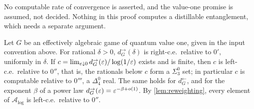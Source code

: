 No computable rate of convergence is asserted, and the value-one promise is assumed, not decided. Nothing in this proof computes a
distillable entanglement, which needs a separate argument.

\begin{theorem}\label{thm:arithmetic}
Let $G$ be an effectively algebraic game of quantum value one, given in the input convention above. For rational $\delta>0$,
$d^\to_G(\delta)$ is right-c.e.\ relative to $0'$,
uniformly in $\delta$. If $c=\lim_{\varepsilon\downarrow0}d^\to_G(\varepsilon)/\log(1/\varepsilon)$ exists and is finite, then $c$ is left-c.e.\ relative to $0''$,
that is, the rationals below $c$ form a $\Sigma^0_3$ set; in particular $c$ is computable relative to $0'''$, a $\Delta^0_4$ real. The same holds
for $d^\leftarrow_G$, and for the exponent $\beta$ of a power law $d^\to_G(\varepsilon)=\varepsilon^{-\beta+o(1)}$. By \cref{lem:reweighting}, every element of
$\mathcal A_{\log}$ is left-c.e.\ relative to $0''$.
\end{theorem}

